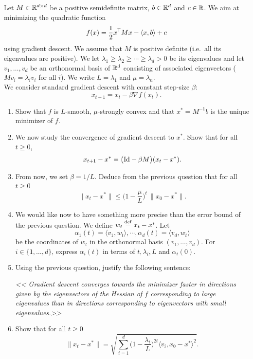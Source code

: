 \documentclass[11pt,nocut]{article}
\begin{document}
\begin{problem}[5 points]\label{p:grad}
	Let $M \in \mathbb{R}^{d \times d}$ be a positive semidefinite matrix, $b \in \mathbb{R}^d$ and $c \in \mathbb{R}$. We aim at minimizing the quadratic function
	$$
	f(x) = \frac{1}{2} x^{{\sf T}} M x - \langle x,b \rangle + c
	$$
	using gradient descent. 
	We assume that $M$ is positive definite (i.e.\ all its eigenvalues are positive).
	We let $\lambda_1 \geq \lambda_2 \geq \cdots \geq \lambda_d >0$ be its eigenvalues and let $v_1, \dots, v_d$ be an orthonormal basis of $\mathbb{R}^d$ consisting of associated eigenvectors ($Mv_i = \lambda_i v_i$ for all $i$).
	We write $L = \lambda_1$ and $\mu = \lambda_n$.
	\\

	We consider standard gradient descent with constant step-size $\beta$:
$$
x_{t+1} = x_t - \beta \nabla f(x_t).
$$
	\begin{enumerate}[label=\normalfont(\textbf{\alph*})]
		\item Show that $f$ is $L$-smooth, $\mu$-strongly convex and that $x^* = M^{-1} b$ is the unique minimizer of $f$.
		\item We now study the convergence of gradient descent to $x^*$. Show that for all $t \geq 0$,
			$$
			x_{t+1} - x^* = \big({{\rm Id}} - \beta M \big)(x_t - x^*).
			$$
		\item From now, we set $\beta = 1/L$. Deduce from the previous question that for all $t \geq 0$
			$$
			\|x_t - x^* \| \leq \Big(1- \frac{\mu}{L}\Big)^{\! t} \, \|x_0 - x^*\|.
			$$
		\item We would like now to have something more precise than the error bound of the previous question. We define $w_t \overset{\rm def}{=} x_t -x^*$. Let 
			$$
			\alpha_1(t) = \langle v_1, w_t \rangle, \cdots, \alpha_d(t) = \langle v_d, w_t \rangle
			$$
			be the coordinates of $w_t$ in the orthonormal basis $(v_1, \dots, v_d)$.
			For $i \in \{1, \dots, d\}$, express $\alpha_i(t)$ in terms of $t,\lambda_i,L$ and $\alpha_i(0)$. 
		\item Using the previous question, justify the following sentence:
			\begin{center}
			\emph{
				<< Gradient descent converges towards the minimizer faster in directions given  by the eigenvectors of the Hessian of $f$ corresponding to large eigenvalues than in directions corresponding to eigenvectors with small eigenvalues.>>
			}
			\end{center}
		\item Show that for all $t \geq 0$
			$$
			\|x_t - x^* \| = \sqrt{\sum_{i=1}^d \Big(1-\frac{\lambda_i}{L}\Big)^{\!2t} \big\langle v_i, x_0-x^* \big\rangle^2}.
			$$
	\end{enumerate}
\end{problem}
\end{document}

